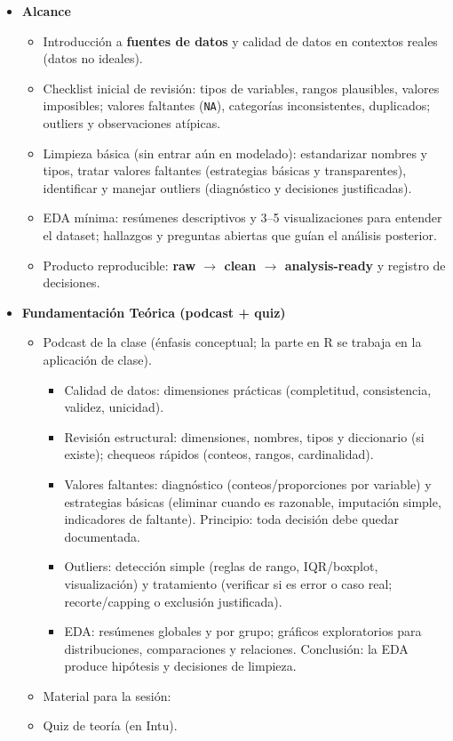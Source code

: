 \documentclass{article}
\begin{document}
\begin{itemize}
\item \textbf{Alcance}
\begin{itemize}
  \item Introducción a \textbf{fuentes de datos} y calidad de datos en contextos reales (datos no ideales).
  \item Checklist inicial de revisión: tipos de variables, rangos plausibles, valores imposibles; valores faltantes (\texttt{NA}), categorías inconsistentes, duplicados; outliers y observaciones atípicas.
  \item Limpieza básica (sin entrar aún en modelado): estandarizar nombres y tipos, tratar valores faltantes (estrategias básicas y transparentes), identificar y manejar outliers (diagnóstico y decisiones justificadas).
  \item EDA mínima: resúmenes descriptivos y 3--5 visualizaciones para entender el dataset; hallazgos y preguntas abiertas que guían el análisis posterior.
  \item Producto reproducible: \textbf{raw $\rightarrow$ clean $\rightarrow$ analysis-ready} y registro de decisiones.
\end{itemize}

\item \textbf{Fundamentación Teórica (podcast + quiz)}
\begin{itemize}
  \item Podcast de la clase (énfasis conceptual; la parte en R se trabaja en la aplicación de clase). %
  \begin{itemize}
    \item Calidad de datos: dimensiones prácticas (completitud, consistencia, validez, unicidad).
    \item Revisión estructural: dimensiones, nombres, tipos y diccionario (si existe); chequeos rápidos (conteos, rangos, cardinalidad).
    \item Valores faltantes: diagnóstico (conteos/proporciones por variable) y estrategias básicas (eliminar cuando es razonable, imputación simple, indicadores de faltante). Principio: toda decisión debe quedar documentada.
    \item Outliers: detección simple (reglas de rango, IQR/boxplot, visualización) y tratamiento (verificar si es error o caso real; recorte/capping o exclusión justificada).
    \item EDA: resúmenes globales y por grupo; gráficos exploratorios para distribuciones, comparaciones y relaciones. Conclusión: la EDA produce hipótesis y decisiones de limpieza.
  \end{itemize}
  \item Material para la sesión: %
  \item Quiz de teoría (en Intu).
\end{itemize}


\end{itemize}
\end{document}
